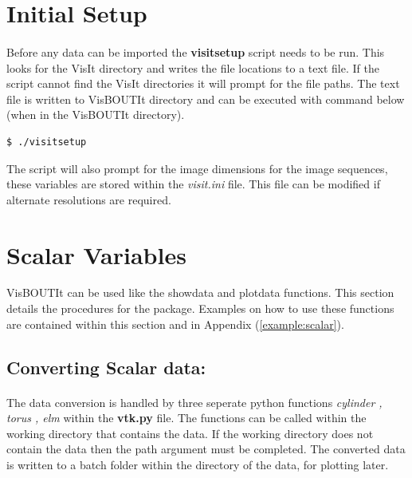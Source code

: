 \documentclass[12pt,a4paper]{article}
\begin{document}
	
\section{Initial Setup}
\label{sec:initial}
\paragraph{}
	
Before any data can be imported the \textbf{visitsetup} script needs to be run. This looks for the VisIt directory and writes the file locations to a text file. If the script cannot find the VisIt directories it will prompt for the file paths. The text file is written to VisBOUTIt directory and can be executed with command below (when in the VisBOUTIt directory).
	
\begin{verbatim}
$ ./visitsetup
\end{verbatim}
	
The script will also prompt for the image dimensions for the image sequences, these variables are stored within the \textit{visit.ini} file. This file can be modified if alternate resolutions are required.

	
	
\section{Scalar Variables}
\label{sec:scalar} VisBOUTIt can be used like the showdata and plotdata functions. This section details the procedures for the package. Examples on how to use these functions are contained within this section and in Appendix (\ref{example:scalar}).
	
	\subsection{Converting Scalar data:}
	
	\paragraph{}
	The data conversion is handled by three seperate python functions \textit{cylinder , torus , elm} within the \textbf{vtk.py} file. The functions can be called within the working directory that contains the data. If the working directory does not contain the data then the path argument must be completed. The converted data is written to a batch folder within the directory of the data, for plotting later.
\end{document}
